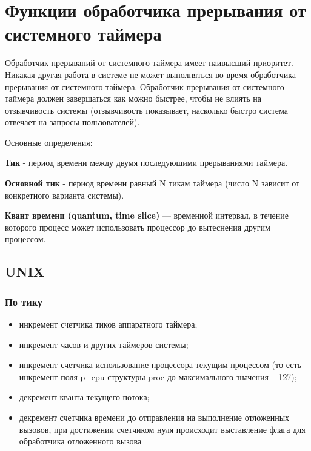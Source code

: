 \chapter{Функции обработчика прерывания от системного таймера}
Обработчик прерываний от системного таймера имеет наивысший приоритет. 
Никакая другая работа в системе не может выполняться во время обработчика прерывания от системного таймера. 
Обработчик прерывания от системного таймера должен завершаться как можно быстрее, чтобы не
влиять на отзывчивость системы (отзывчивость показывает, насколько быстро система отвечает на запросы пользователей).

Основные определения: 

\textbf{Тик} - период времени между двумя последующими прерываниями таймера.

\textbf{Основной тик} - период времени равный N тикам таймера (число N зависит от конкретного варианта системы).

\textbf{Квант времени (quantum, time slice)} — временной интервал, в течение которого процесс может использовать процессор до вытеснения другим
процессом.

\section{UNIX}
\subsection*{По тику}
\begin{itemize}
	\item инкремент счетчика тиков аппаратного таймера;
	\item инкремент часов и других таймеров системы;
	\item инкремент счетчика использование процессора текущим процессом (то есть инкремент поля p\_cpu структуры proc до максимального
	значения – 127);
	\item декремент кванта текущего потока;
	\item декремент счетчика времени до отправления на выполнение отложенных вызовов, 
	при достижении счетчиком нуля происходит выставление флага для обработчика отложенного вызова
\end{itemize}


